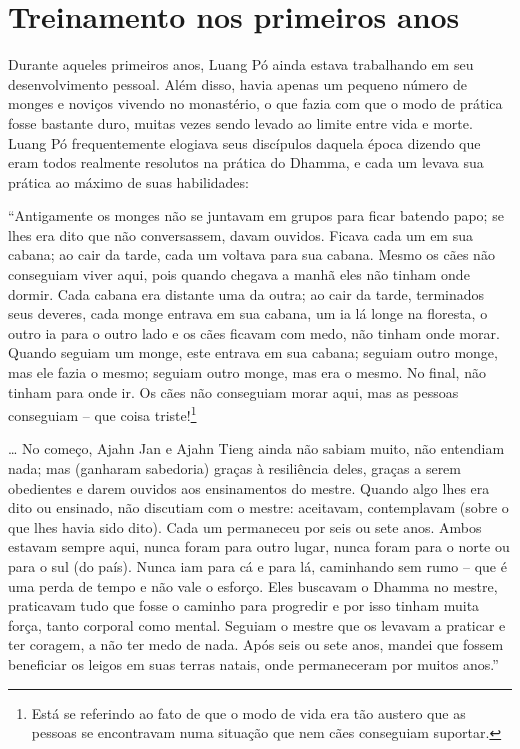 \chapter{Treinamento nos primeiros anos}

Durante aqueles primeiros anos, Luang Pó ainda estava trabalhando em seu
desenvolvimento pessoal. Além disso, havia apenas um pequeno número de
monges e noviços vivendo no monastério, o que fazia com que o modo de
prática fosse bastante duro, muitas vezes sendo levado ao limite entre
vida e morte. Luang Pó frequentemente elogiava seus discípulos daquela
época dizendo que eram todos realmente resolutos na prática do Dhamma, e
cada um levava sua prática ao máximo de suas habilidades:

``Antigamente os monges não se juntavam em grupos para ficar batendo
papo; se lhes era dito que não conversassem, davam ouvidos. Ficava cada
um em sua cabana; ao cair da tarde, cada um voltava para sua cabana.
Mesmo os cães não conseguiam viver aqui, pois quando chegava a manhã
eles não tinham onde dormir. Cada cabana era distante uma da outra; ao
cair da tarde, terminados seus deveres, cada monge entrava em sua
cabana, um ia lá longe na floresta, o outro ia para o outro lado e os
cães ficavam com medo, não tinham onde morar. Quando seguiam um monge,
este entrava em sua cabana; seguiam outro monge, mas ele fazia o mesmo;
seguiam outro monge, mas era o mesmo. No final, não tinham para onde ir.
Os cães não conseguiam morar aqui, mas as pessoas conseguiam -- que
coisa triste!\footnote{Está se referindo ao fato de que o modo de vida
  era tão austero que as pessoas se encontravam numa situação que nem
  cães conseguiam suportar.}

\ldots{} No começo, Ajahn Jan e Ajahn Tieng ainda não sabiam muito, não
entendiam nada; mas (ganharam sabedoria) graças à resiliência deles,
graças a serem obedientes e darem ouvidos aos ensinamentos do mestre.
Quando algo lhes era dito ou ensinado, não discutiam com o mestre:
aceitavam, contemplavam (sobre o que lhes havia sido dito). Cada um
permaneceu por seis ou sete anos. Ambos estavam sempre aqui, nunca foram
para outro lugar, nunca foram para o norte ou para o sul (do país).
Nunca iam para cá e para lá, caminhando sem rumo -- que é uma perda de
tempo e não vale o esforço. Eles buscavam o Dhamma no mestre, praticavam
tudo que fosse o caminho para progredir e por isso tinham muita força,
tanto corporal como mental. Seguiam o mestre que os levavam a praticar e
ter coragem, a não ter medo de nada. Após seis ou sete anos, mandei que
fossem beneficiar os leigos em suas terras natais, onde permaneceram por
muitos anos.''

